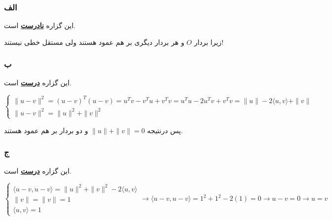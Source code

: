 \subsubsection*{الف}

این گزاره \underline{\textbf{نادرست}} است.

زیرا بردار $O$ و هر بردار دیگری بر هم عمود هستند ولی مستقل خطی نیستند!


\subsubsection*{ب}

این گزاره \underline{\textbf{درست}} است.

\setLTR

$\begin{cases}
	\| u - v \| ^ 2 =  (u - v)^T(u-v) = u^Tv-v^Tu+v^Tv=u^Tu-2u^Tv+v^Tv = \| u \| - 2 \langle  u,v\rangle  + \|v \| \\
		\| u - v \| ^ 2 = 	\| u  \| ^ 2 + 	\|  v \| ^ 2
\end{cases}$

\setRTL

پس درنتیجه
 $\| u \| + \| v \| = 0$
  و دو بردار بر هم عمود هستند.

\subsubsection*{ج}
این گزاره \underline{\textbf{درست}} است.

\setLTR

$\begin{cases}
	\langle u-v,u-v\rangle = \| u \| ^ 2 + \| v \| ^ 2 - 2 \langle u,v\rangle \\
	 \|v\| = \|v\| = 1 \\
	 \langle u,v \rangle = 1
\end{cases}  \longrightarrow  \langle u -v  , u-v \rangle = 1^2 + 1^2 -2(1) = 0 \rightarrow u - v = 0 \rightarrow u = v$

\setRTL

